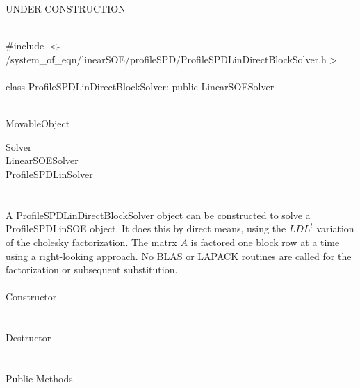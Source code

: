 
UNDER CONSTRUCTION 

   \\
\indent \#include $<\tilde{
}$/system\_of\_eqn/linearSOE/profileSPD/ProfileSPDLinDirectBlockSolver.h$>$
\\ 

  \\
class ProfileSPDLinDirectBlockSolver: public LinearSOESolver  


 \\
MovableObject 

\indent\indent  Solver \\
\indent\indent\indent LinearSOESolver \\
\indent\indent\indent\indent ProfileSPDLinSolver \\
\indent\indent\indent\indent{} \\

  \\
\indent A ProfileSPDLinDirectBlockSolver object can be constructed to
solve a ProfileSPDLinSOE object. It does this by direct means, using
the $LDL^t$ variation of the cholesky factorization. The matrx $A$ is
factored one block row at a time using a right-looking approach. No BLAS
or LAPACK routines are called for the factorization or subsequent substitution. \\

  \\
\indent\indent Constructor \\
\indent{}  \\ \\
\indent\indent Destructor \\
\indent{}\\  \\
\indent\indent Public Methods \\
\indent{} \\
\indent{} \\
\indent{}\\ 
\indent{}\\ 


